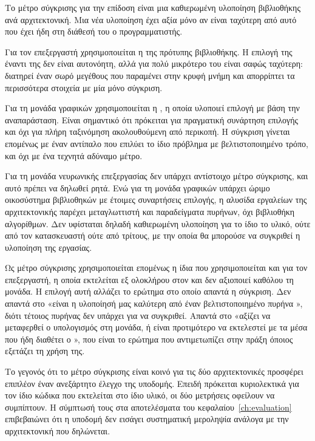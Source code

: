 Το μέτρο σύγκρισης για την επίδοση είναι μια καθιερωμένη υλοποίηση βιβλιοθήκης
ανά αρχιτεκτονική. Μια νέα υλοποίηση έχει αξία μόνο αν είναι ταχύτερη από αυτό
που έχει ήδη στη διάθεσή του ο προγραμματιστής.

Για τον επεξεργαστή χρησιμοποιείται η  της πρότυπης
βιβλιοθήκης. Η επιλογή της έναντι της  δεν είναι
αυτονόητη, αλλά για  πολύ μικρότερο του  είναι σαφώς ταχύτερη:
διατηρεί έναν σωρό μεγέθους  που παραμένει στην κρυφή μνήμη και απορρίπτει
τα περισσότερα στοιχεία με μία μόνο σύγκριση.

Για τη μονάδα γραφικών χρησιμοποιείται η , η οποία υλοποιεί
επιλογή με βάση την αναπαράσταση. Είναι σημαντικό ότι πρόκειται για πραγματική
συνάρτηση επιλογής  και όχι για πλήρη ταξινόμηση ακολουθούμενη από
περικοπή. Η σύγκριση γίνεται επομένως με έναν αντίπαλο που επιλύει το ίδιο
πρόβλημα με βελτιστοποιημένο τρόπο, και όχι με ένα τεχνητά αδύναμο μέτρο.

Για τη μονάδα νευρωνικής επεξεργασίας δεν υπάρχει αντίστοιχο μέτρο σύγκρισης,
και αυτό πρέπει να δηλωθεί ρητά. Ενώ για τη μονάδα γραφικών υπάρχει ώριμο
οικοσύστημα βιβλιοθηκών με έτοιμες συναρτήσεις επιλογής, η αλυσίδα εργαλείων της
αρχιτεκτονικής  παρέχει μεταγλωττιστή και παραδείγματα πυρήνων, όχι
βιβλιοθήκη αλγορίθμων. Δεν υφίσταται δηλαδή καθιερωμένη υλοποίηση  για
το ίδιο το υλικό, ούτε από τον κατασκευαστή ούτε από τρίτους, με την οποία θα
μπορούσε να συγκριθεί η υλοποίηση της εργασίας.

Ως μέτρο σύγκρισης χρησιμοποιείται επομένως η ίδια  που
χρησιμοποιείται και για τον επεξεργαστή, η οποία εκτελείται εξ ολοκλήρου στον
 και δεν αξιοποιεί καθόλου τη μονάδα. Η επιλογή αυτή αλλάζει το ερώτημα
στο οποίο απαντά η σύγκριση. Δεν απαντά στο «είναι η υλοποίησή μας καλύτερη από
έναν βελτιστοποιημένο πυρήνα », διότι τέτοιος πυρήνας δεν υπάρχει για να
συγκριθεί. Απαντά στο «αξίζει να μεταφερθεί ο υπολογισμός στη μονάδα, ή είναι
προτιμότερο να εκτελεστεί με τα μέσα που ήδη διαθέτει ο », που είναι το
ερώτημα που αντιμετωπίζει στην πράξη όποιος εξετάζει τη χρήση της.

Το γεγονός ότι το μέτρο σύγκρισης είναι κοινό για τις δύο αρχιτεκτονικές
προσφέρει επιπλέον έναν ανεξάρτητο έλεγχο της υποδομής. Επειδή πρόκειται
κυριολεκτικά για τον ίδιο κώδικα που εκτελείται στο ίδιο υλικό, οι δύο μετρήσεις
οφείλουν να συμπίπτουν. Η σύμπτωσή τους στα αποτελέσματα του
κεφαλαίου~\ref{ch:evaluation} επιβεβαιώνει ότι η υποδομή δεν εισάγει
συστηματική μεροληψία ανάλογα με την αρχιτεκτονική που δηλώνεται.

